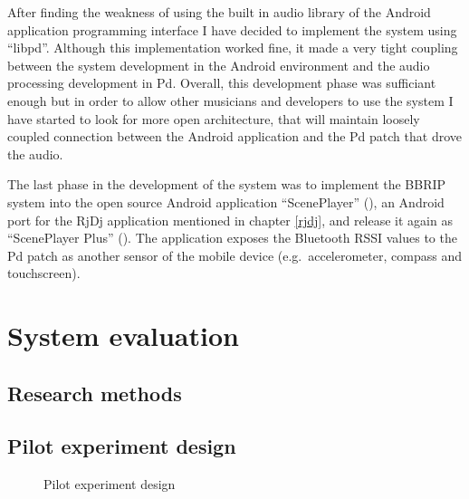 \documentclass[a4paper,11pt]{article}
\begin{document}
{After finding the weakness of using the built in audio library of the Android application programming interface I have decided to implement the system using ``libpd''.
Although this implementation worked fine, it made a very tight coupling between the system development in the Android environment and the audio processing development in Pd.
Overall, this development phase was sufficiant enough but in order to allow other musicians and developers to use the system I have started to look for more open architecture, that will maintain loosely coupled connection between the Android application and the Pd patch that drove the audio.

The last phase in the development of the system was to implement the BBRIP system into the open source Android application ``ScenePlayer'' (\cite{web:sceneplayer}), an Android port for the RjDj application mentioned in chapter \ref{rjdj}, and release it again as ``ScenePlayer Plus'' (\cite{web:sceneplayerplus}).
The application exposes the Bluetooth RSSI values to the Pd patch as another sensor of the mobile device (e.g.\ accelerometer, compass and touchscreen).

\section{System evaluation}

\subsection{Research methods}


\subsection{Pilot experiment design}

\begin{figure}[!htb]
	\centering
	\def\svgwidth{0.95\columnwidth}
  	
	\caption{Pilot experiment design}\label{fig:pilot}
\end{figure}

}
\end{document}
